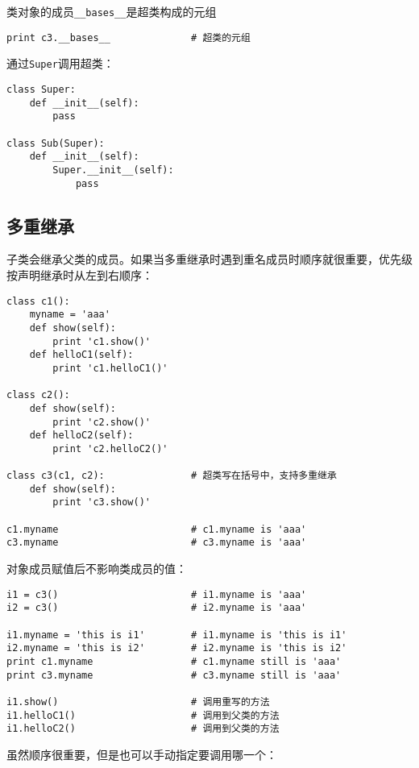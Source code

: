 类对象的成员\verb|__bases__|是超类构成的元组

\begin{lstlisting}
print c3.__bases__              # 超类的元组
\end{lstlisting}

通过\verb|Super|调用超类：

\begin{lstlisting}
class Super:
	def __init__(self):
		pass

class Sub(Super):
	def __init__(self):
		Super.__init__(self):
			pass
\end{lstlisting}

\subsection{多重继承}

子类会继承父类的成员。如果当多重继承时遇到重名成员时顺序就很重要，优先级按声明继承时从左到右顺序：

\begin{lstlisting}
class c1():
	myname = 'aaa'
	def show(self):
		print 'c1.show()'
	def helloC1(self):
		print 'c1.helloC1()'

class c2():
	def show(self):
		print 'c2.show()'
	def helloC2(self):
		print 'c2.helloC2()'

class c3(c1, c2):               # 超类写在括号中，支持多重继承
	def show(self):
		print 'c3.show()'

c1.myname                       # c1.myname is 'aaa'
c3.myname                       # c3.myname is 'aaa'
\end{lstlisting}

对象成员赋值后不影响类成员的值：

\begin{lstlisting}
i1 = c3()                       # i1.myname is 'aaa'
i2 = c3()                       # i2.myname is 'aaa'

i1.myname = 'this is i1'        # i1.myname is 'this is i1'
i2.myname = 'this is i2'        # i2.myname is 'this is i2'
print c1.myname                 # c1.myname still is 'aaa'
print c3.myname                 # c3.myname still is 'aaa'

i1.show()                       # 调用重写的方法
i1.helloC1()                    # 调用到父类的方法
i1.helloC2()                    # 调用到父类的方法
\end{lstlisting}

虽然顺序很重要，但是也可以手动指定要调用哪一个：

